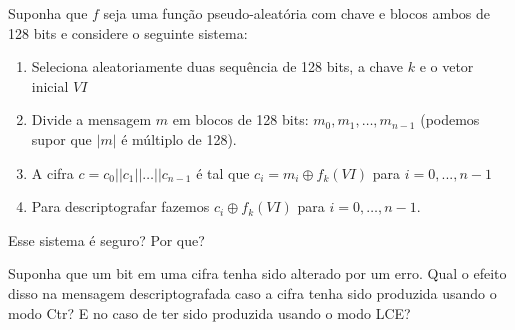 \begin{exercicio}
  Suponha que $f$ seja uma função pseudo-aleatória com chave e blocos ambos de 128 bits e considere o seguinte sistema:
  \begin{enumerate}
  \item Seleciona aleatoriamente duas sequência de 128 bits, a chave $k$ e o vetor inicial $VI$
  \item Divide a mensagem $m$ em blocos de 128 bits: $m_0, m_1, \dots, m_{n-1}$ (podemos supor que $|m|$ é múltiplo de 128).
  \item A cifra $c = c_0 || c_1 || \dots || c_{n-1}$ é tal que $c_i = m_i \oplus f_k(VI)$ para $i = 0, ..., n-1$
  \item Para descriptografar fazemos $c_i \oplus f_k(VI)$ para $i = 0, \dots, n-1$.
  \end{enumerate}
  Esse sistema é seguro? Por que?
\end{exercicio}

\begin{exercicio}
Suponha que um bit em uma cifra tenha sido alterado por um erro.
Qual o efeito disso na mensagem descriptografada caso a cifra tenha sido produzida usando o modo Ctr? E no caso de ter sido produzida usando o modo LCE?  
\end{exercicio}
